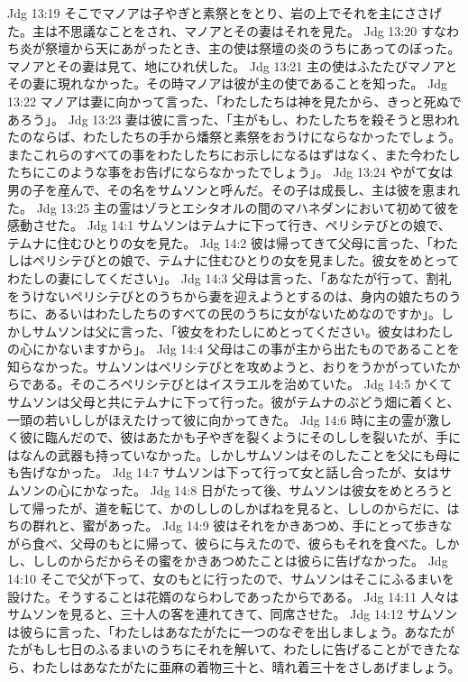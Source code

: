 Jdg 13:19  そこでマノアは子やぎと素祭とをとり、岩の上でそれを主にささげた。主は不思議なことをされ、マノアとその妻はそれを見た。
Jdg 13:20  すなわち炎が祭壇から天にあがったとき、主の使は祭壇の炎のうちにあってのぼった。マノアとその妻は見て、地にひれ伏した。
Jdg 13:21  主の使はふたたびマノアとその妻に現れなかった。その時マノアは彼が主の使であることを知った。
Jdg 13:22  マノアは妻に向かって言った、「わたしたちは神を見たから、きっと死ぬであろう」。
Jdg 13:23  妻は彼に言った、「主がもし、わたしたちを殺そうと思われたのならば、わたしたちの手から燔祭と素祭をおうけにならなかったでしょう。またこれらのすべての事をわたしたちにお示しになるはずはなく、また今わたしたちにこのような事をお告げにならなかったでしょう」。
Jdg 13:24  やがて女は男の子を産んで、その名をサムソンと呼んだ。その子は成長し、主は彼を恵まれた。
Jdg 13:25  主の霊はゾラとエシタオルの間のマハネダンにおいて初めて彼を感動させた。
Jdg 14:1  サムソンはテムナに下って行き、ペリシテびとの娘で、テムナに住むひとりの女を見た。
Jdg 14:2  彼は帰ってきて父母に言った、「わたしはペリシテびとの娘で、テムナに住むひとりの女を見ました。彼女をめとってわたしの妻にしてください」。
Jdg 14:3  父母は言った、「あなたが行って、割礼をうけないペリシテびとのうちから妻を迎えようとするのは、身内の娘たちのうちに、あるいはわたしたちのすべての民のうちに女がないためなのですか」。しかしサムソンは父に言った、「彼女をわたしにめとってください。彼女はわたしの心にかないますから」。
Jdg 14:4  父母はこの事が主から出たものであることを知らなかった。サムソンはペリシテびとを攻めようと、おりをうかがっていたからである。そのころペリシテびとはイスラエルを治めていた。
Jdg 14:5  かくてサムソンは父母と共にテムナに下って行った。彼がテムナのぶどう畑に着くと、一頭の若いししがほえたけって彼に向かってきた。
Jdg 14:6  時に主の霊が激しく彼に臨んだので、彼はあたかも子やぎを裂くようにそのししを裂いたが、手にはなんの武器も持っていなかった。しかしサムソンはそのしたことを父にも母にも告げなかった。
Jdg 14:7  サムソンは下って行って女と話し合ったが、女はサムソンの心にかなった。
Jdg 14:8  日がたって後、サムソンは彼女をめとろうとして帰ったが、道を転じて、かのししのしかばねを見ると、ししのからだに、はちの群れと、蜜があった。
Jdg 14:9  彼はそれをかきあつめ、手にとって歩きながら食べ、父母のもとに帰って、彼らに与えたので、彼らもそれを食べた。しかし、ししのからだからその蜜をかきあつめたことは彼らに告げなかった。
Jdg 14:10  そこで父が下って、女のもとに行ったので、サムソンはそこにふるまいを設けた。そうすることは花婿のならわしであったからである。
Jdg 14:11  人々はサムソンを見ると、三十人の客を連れてきて、同席させた。
Jdg 14:12  サムソンは彼らに言った、「わたしはあなたがたに一つのなぞを出しましょう。あなたがたがもし七日のふるまいのうちにそれを解いて、わたしに告げることができたなら、わたしはあなたがたに亜麻の着物三十と、晴れ着三十をさしあげましょう。

